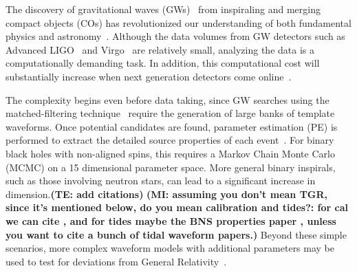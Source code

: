 \documentclass[twocolumn]{aastex631}
\newcommand{\te}[1]{\textbf{\color{pyGreen}(TE: #1)}}
\newcommand{\kw}[1]{{\color{rb4}[KW: #1 ]}}
\newcommand{\AZ}[1]{{\color{Burnt}[AZ: #1]}}
\newcommand{\mi}[1]{\textbf{\color{teal}(MI: #1)}}
\begin{document}
The discovery of gravitational waves (GWs)~\citep{LIGOScientific:2016aoc} from inspiraling and merging compact objects (COs) has revolutionized our understanding of both fundamental physics and astronomy~\citep[e.g.][]{LIGOScientific:2021djp,LIGOScientific:2021sio,LIGOScientific:2021psn}.
Although the data volumes from GW detectors such as Advanced LIGO~\citep{LIGOScientific:2014pky} and Virgo~\citep{VIRGO:2014yos} are relatively small, analyzing the data is a computationally demanding task.
In addition, this computational cost will substantially increase when next generation detectors come online~\citep{Maggiore:2019uih, Reitze:2019iox, Evans:2021gyd}.

The complexity begins even before data taking, since GW searches using the matched-filtering technique~\citep{Owen:1998dk, Owen:1995tm} require the generation of large banks of template waveforms.
Once potential candidates are found, parameter estimation (PE) is performed to extract the detailed source properties of each event~\citep{Christensen:2022bxb, 2020MNRAS.493.3132S, Ashton:2018jfp, Romero-Shaw:2020owr, Veitch:2014wba, Biwer:2018osg}.
For binary black holes with non-aligned spins, this requires a Markov Chain Monte Carlo (MCMC) on a 15 dimensional parameter space.
More general binary inspirals, such as those involving neutron stars, can lead to a significant increase in dimension.\te{add citations} \mi{assuming you don't mean TGR, since it's mentioned below, do you mean calibration and tides?: for cal we can cite \cite{Farr:2014,Vitale:2020gvb}, and for tides maybe the BNS properties paper \cite{LIGOScientific:2018hze}, unless you want to cite a bunch of tidal waveform papers.}
Beyond these simple scenarios, more complex waveform models with additional parameters may be used to test for deviations from General Relativity~\citep{Arun:2006yw, Agathos:2013upa, Yunes:2016jcc, LIGOScientific:2016lio, LIGOScientific:2020tif, Krishnendu:2021fga}.
\end{document}
